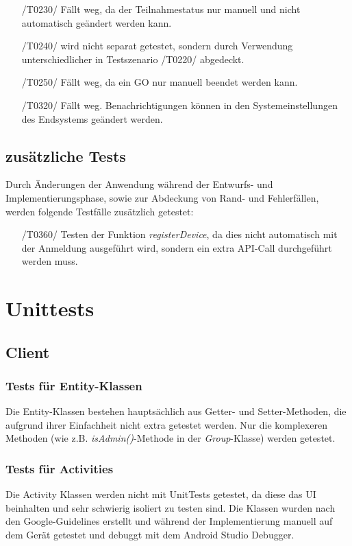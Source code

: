 \documentclass[11pt,a4paper]{scrartcl}
\begin{document}
\begin{itemize}
	\item[/T0230/] Fällt weg, da der Teilnahmestatus nur manuell und nicht automatisch geändert werden kann.
	
	\item[/T0240/] wird nicht separat getestet, sondern durch Verwendung unterschiedlicher in Testszenario /T0220/ abgedeckt.
	
	\item[/T0250/] Fällt weg, da ein GO nur manuell beendet werden kann.
	
	\item[/T0320/] Fällt weg. Benachrichtigungen können in den Systemeinstellungen des Endsystems geändert werden.
	
\end{itemize}

\subsection{zusätzliche Tests}
Durch Änderungen der Anwendung während der Entwurfs- und Implementierungsphase, sowie zur Abdeckung von Rand- und Fehlerfällen, werden folgende Testfälle zusätzlich getestet:
\begin{itemize}
	\item[/T0360/]\label{360} Testen der Funktion \textit{registerDevice}, da dies nicht automatisch mit der Anmeldung ausgeführt wird, sondern ein extra API-Call durchgeführt werden muss.
\end{itemize}

\newpage

\section{Unittests}

\subsection{Client}

\subsubsection{Tests für Entity-Klassen}
Die Entity-Klassen bestehen hauptsächlich aus Getter- und Setter-Methoden, die aufgrund ihrer Einfachheit nicht extra getestet werden. Nur die komplexeren Methoden (wie z.B. \textit{isAdmin()}-Methode in der \textit{Group}-Klasse) werden getestet.

\subsubsection{Tests für Activities}
Die Activity Klassen werden nicht mit UnitTests getestet, da diese das UI beinhalten und sehr schwierig isoliert zu testen sind. Die Klassen wurden nach den Google-Guidelines erstellt und während der Implementierung manuell auf dem Gerät getestet und debuggt mit dem Android Studio Debugger.
\end{document}

